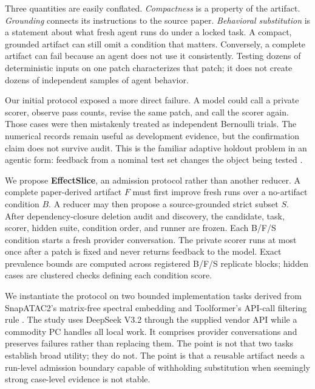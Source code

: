 \documentclass[letterpaper]{article} %
\begin{document}
Three quantities are easily conflated.  \emph{Compactness} is a property of
the artifact.  \emph{Grounding} connects its instructions to the source paper.
\emph{Behavioral substitution} is a statement about what fresh agent runs do
under a locked task.  A compact, grounded artifact can still omit a condition
that matters.  Conversely, a complete artifact can fail because an agent does
not use it consistently.  Testing dozens of deterministic inputs on one patch
characterizes that patch; it does not create dozens of independent samples of
agent behavior.

Our initial protocol exposed a more direct failure.  A model could call a
private scorer, observe pass counts, revise the same patch, and call the scorer
again.  Those cases were then mistakenly treated as independent Bernoulli
trials.  The numerical records remain useful as development evidence, but the
confirmation claim does not survive audit.  This is the familiar adaptive
holdout problem in an agentic form: feedback from a nominal test set changes
the object being tested \cite{dwork2015reusableholdout,
nakkiran2018genericholdout}.

We propose \textbf{EffectSlice}, an admission protocol rather than another
reducer.  A complete paper-derived artifact $F$ must first improve fresh runs
over a no-artifact condition $B$.  A reducer may then propose a source-grounded
strict subset $S$.  After dependency-closure deletion audit and discovery, the
candidate, task, scorer, hidden suite, condition order, and runner are frozen.
Each B/F/S condition starts a fresh provider conversation.  The private scorer
runs at most once after a patch is fixed and never returns feedback to the
model.  Exact prevalence bounds are computed across registered B/F/S replicate
blocks; hidden cases are clustered checks defining each condition score.

We instantiate the protocol on two bounded implementation tasks derived from
SnapATAC2's matrix-free spectral embedding \cite{zhang2024snapatac2} and
Toolformer's API-call filtering rule \cite{schick2023toolformer}.  The study
uses DeepSeek V3.2 through the supplied vendor API while a commodity PC handles
all local work.  It comprises \EffectSliceProviderConversations{} provider
conversations and preserves failures rather than replacing them.  The point is
not that two tasks establish broad utility; they do not.  The point is that a
reusable artifact needs a run-level admission boundary capable of withholding
substitution when seemingly strong case-level evidence is not stable.
\end{document}
